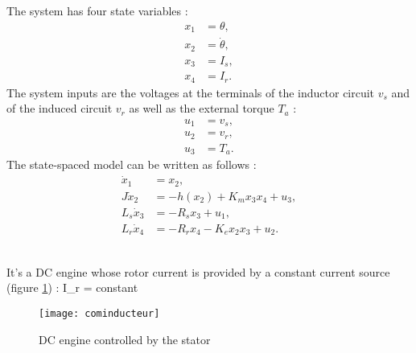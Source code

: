 The system has four state variables  :
\begin{equation*} \begin{split}
x_1 &= \theta, \\
x_2 &= \dot{\theta}, \\
x_3 &= I_s, \\
x_4 &= I_r.
\end{split} \end{equation*}
The system inputs are the voltages at the terminals of the inductor circuit $v_s$ and of the induced circuit $v_r$ as well as  the external torque $T_a$ :
\begin{equation*} \begin{split}
u_1 &= v_s, \\
u_2 &= v_r, \\
u_3 &= T_a.
\end{split} \end{equation*}
The state-spaced model can be written as follows :
\begin{equation*} \begin{split}
\dot x_1 &= x_2,\\
J\dot x_2 &= -h(x_2) + K_m x_3x_4 + u_3,\\
L_s\dot x_3 &= -R_s x_3 + u_1,\\
L_r\dot x_4 &= -R_r x_4 - K_ex_2x_3 + u_2.
\end{split} \end{equation*}
\\

It's a DC engine whose rotor current is provided by a constant current source (figure \ref{fig:cominducteur}) :
\eqnn
I_r = constant
\eeqnn
\begin{figure}[htbp]
\begin{center}
\texttt{[image: cominducteur]}
\caption{ DC engine controlled by the stator}
\label{fig:cominducteur}
\end{center}
\end{figure}

